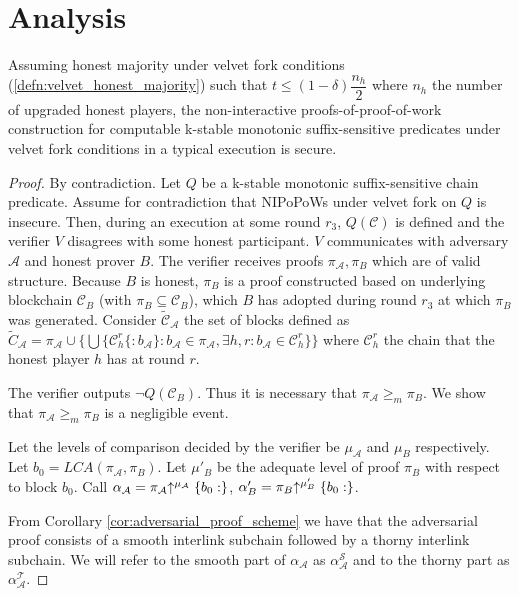 \section{Analysis}
\begin{theorem}
	Assuming honest majority under velvet fork conditions (\ref{defn:velvet_honest_majority}) such that $t \leq (1 - \delta) \dfrac{n_h}{2}$ where $n_h$ the number of upgraded honest players, the non-interactive proofs-of-proof-of-work construction for computable k-stable monotonic suffix-sensitive predicates under velvet fork conditions in a typical execution is secure.
\end{theorem}
\begin{proof}
By contradiction. Let $Q$ be a k-stable monotonic suffix-sensitive chain predicate. Assume for contradiction that NIPoPoWs under velvet fork on $Q$ is insecure. Then, during an execution at some round  $r_3$, $Q(\mathcal{C})$ is defined and the verifier $V$ disagrees with some honest participant. $V$ communicates with adversary $\mathcal{A}$ and honest prover $B$. The verifier receives proofs $\pi_\mathcal{A}, \pi_B$ which are of valid structure. Because $B$ is honest, $\pi_B$ is a proof constructed based on underlying blockchain $\mathcal{C}_B$ (with $\pi_B \subseteq \mathcal{C}_B$), which $B$ has adopted during round $r_3$ at which $\pi_B$ was generated. Consider $\widetilde{\mathcal{C}}_\mathcal{A}$ the set of blocks defined as $\widetilde{C}_\mathcal{A} = \pi_\mathcal{A} \cup \{ \bigcup \{\mathcal{C}_h^r\{:b_\mathcal{A}\}:  b_\mathcal{A} \in \pi_\mathcal{A}, \exists h,r : b_\mathcal{A} \in \mathcal{C}_{h}^{r}\}  \}$ where $\mathcal{C}_h^r$ the chain  that the honest player $h$ has at round $r$.

The verifier outputs $\neg Q(\mathcal{C}_B)$. Thus it is necessary that $\pi_\mathcal{A} {\geq}_m \pi_B$. We show that $\pi_\mathcal{A} {\geq}_m \pi_B$ is a negligible event.

Let the levels of comparison decided by the verifier be $\mu_\mathcal{A}$ and $\mu_B$ respectively. Let $b_0 = LCA(\pi_\mathcal{A}, \pi_B)$. Let $\mu'_B$ be the adequate level of proof $\pi_B$  with respect to block $b_0$. Call $\alpha_\mathcal{A} = \pi_\mathcal{A} \negthickspace\uparrow^{\mu_\mathcal{A}}\{b_0:\}$, $\alpha'_B = \pi_B \negthickspace\uparrow^{\mu'_B}\{b_0:\}$.

From Corollary \ref{cor:adversarial_proof_scheme} we have that the adversarial proof consists of a smooth interlink subchain followed by a thorny interlink subchain. We will refer to the smooth part of $\alpha_\mathcal{A}$ as $\alpha^{\mathcal{S}}_\mathcal{A}$ and to the thorny part as $\alpha^{\mathcal{T}}_\mathcal{A}$.


\end{proof}
